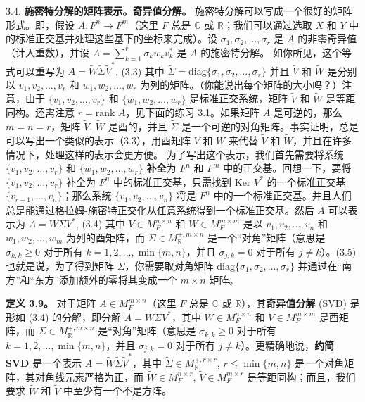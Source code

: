 3.4. \textbf{施密特分解的矩阵表示。奇异值分解。} 施密特分解可以写成一个很好的矩阵形式。即，假设 $A: F^n \to F^m$（这里 $F$ 总是 $\mathbb{C}$ 或 $\mathbb{R}$；我们可以通过选取 $X$ 和 $Y$ 中的标准正交基并处理这些基下的坐标来完成）。设 $\sigma_1, \sigma_2, \dots, \sigma_r$ 是 $A$ 的非零奇异值（计入重数），并设 $A = \sum_{k=1}^r \sigma_k w_k v_k^*$ 是 $A$ 的施密特分解。
如你所见，这个等式可以重写为
$A = \tilde{W} \tilde{\Sigma} \tilde{V}^*$, (3.3)
其中 $\tilde{\Sigma} = \text{diag}\{\sigma_1, \sigma_2, \dots, \sigma_r\}$ 并且 $\tilde{V}$ 和 $\tilde{W}$ 是分别以 $v_1, v_2, \dots, v_r$ 和 $w_1, w_2, \dots, w_r$ 为列的矩阵。（你能说出每个矩阵的大小吗？）注意，由于 $\{v_1, v_2, \dots, v_r\}$ 和 $\{w_1, w_2, \dots, w_r\}$ 是标准正交系统，矩阵 $\tilde{V}$ 和 $\tilde{W}$ 是等距同构。还需注意 $r = \text{rank } A$，见下面的练习 3.1。如果矩阵 $A$ 是可逆的，那么 $m=n=r$，矩阵 $\tilde{V}$, $\tilde{W}$ 是酉的，并且 $\tilde{\Sigma}$ 是一个可逆的对角矩阵。事实证明，总是可以写出一个类似的表示（3.3），用酉矩阵 $V$ 和 $W$ 来代替 $\tilde{V}$ 和 $\tilde{W}$，并且在许多情况下，处理这样的表示会更方便。
为了写出这个表示，我们首先需要将系统 $\{v_1, v_2, \dots, v_r\}$ 和 $\{w_1, w_2, \dots, w_r\}$ \textbf{补全}为 $F^n$ 和 $F^m$ 中的正交基。回想一下，要将 $\{v_1, v_2, \dots, v_r\}$ 补全为 $F^n$ 中的标准正交基，只需找到 $\text{Ker } V^*$ 的一个标准正交基 $\{v_{r+1}, \dots, v_n\}$；那么系统 $\{v_1, v_2, \dots, v_n\}$ 将是 $F^n$ 中的一个标准正交基。并且人们总是能通过格拉姆-施密特正交化从任意系统得到一个标准正交基。然后 $A$ 可以表示为
$A = W \Sigma V^*$, (3.4)
其中 $V \in M_F^{n \times n}$ 和 $W \in M_F^{m \times m}$ 是以 $v_1, v_2, \dots, v_n$ 和 $w_1, w_2, \dots, w_m$ 为列的酉矩阵，而 $\Sigma \in M_\mathbb{R}^{+, m \times n}$ 是一个“对角”矩阵（意思是 $\sigma_{k,k} \geq 0$ 对于所有 $k = 1, 2, \dots, \min\{m, n\}$，并且 $\sigma_{j,k} = 0$ 对于所有 $j \neq k$）。(3.5)
也就是说，为了得到矩阵 $\Sigma$，你需要取对角矩阵 $\text{diag}\{\sigma_1, \sigma_2, \dots, \sigma_r\}$ 并通过在“南方”和“东方”添加额外的零将其变成一个 $m \times n$ 矩阵。

\textbf{定义 3.9。} 对于矩阵 $A \in M_F^{m \times n}$（这里 $F$ 总是 $\mathbb{C}$ 或 $\mathbb{R}$），其\textbf{奇异值分解} (SVD) 是形如 (3.4) 的分解，即分解 $A = W \Sigma V^*$，其中 $W \in M_F^{n \times n}$ 和 $V \in M_F^{m \times m}$ 是酉矩阵，而 $\Sigma \in M_\mathbb{R}^{+, m \times n}$ 是“对角”矩阵（意思是 $\sigma_{k,k} \geq 0$ 对于所有 $k = 1, 2, \dots, \min\{m, n\}$，并且 $\sigma_{j,k} = 0$ 对于所有 $j \neq k$）。更精确地说，\textbf{约简 SVD} 是一个表示 $A = \tilde{W} \tilde{\Sigma} \tilde{V}^*$，其中 $\tilde{\Sigma} \in M_\mathbb{R}^{+, r \times r}$, $r \leq \min\{m, n\}$ 是一个对角矩阵，其对角线元素严格为正，而 $\tilde{W} \in M_F^{n \times r}$, $\tilde{V} \in M_F^{m \times r}$ 是等距同构；而且，我们要求 $\tilde{W}$ 和 $\tilde{V}$ 中至少有一个不是方阵。

